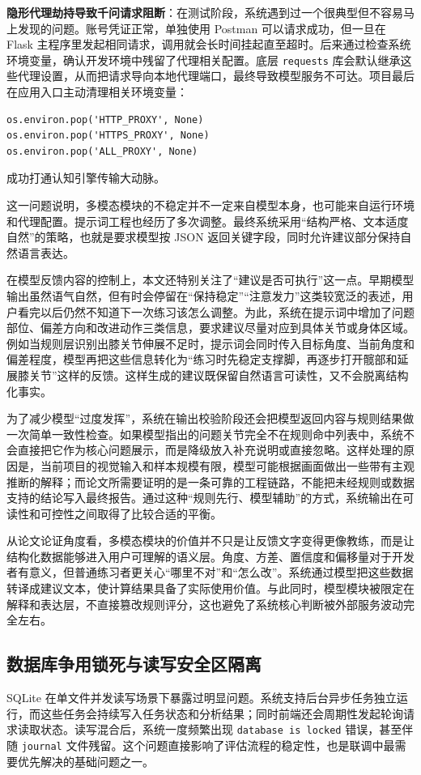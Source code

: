 \textbf{隐形代理劫持导致千问请求阻断}：在测试阶段，系统遇到过一个很典型但不容易马上发现的问题。账号凭证正常，单独使用 Postman 可以请求成功，但一旦在 Flask 主程序里发起相同请求，调用就会长时间挂起直至超时。后来通过检查系统环境变量，确认开发环境中残留了代理相关配置。底层 \texttt{requests} 库会默认继承这些代理设置，从而把请求导向本地代理端口，最终导致模型服务不可达。项目最后在应用入口主动清理相关环境变量：
\begin{verbatim}
os.environ.pop('HTTP_PROXY', None)
os.environ.pop('HTTPS_PROXY', None)
os.environ.pop('ALL_PROXY', None)
\end{verbatim}
成功打通认知引擎传输大动脉。

这一问题说明，多模态模块的不稳定并不一定来自模型本身，也可能来自运行环境和代理配置。提示词工程也经历了多次调整。最终系统采用“结构严格、文本适度自然”的策略，也就是要求模型按 JSON 返回关键字段，同时允许建议部分保持自然语言表达。

在模型反馈内容的控制上，本文还特别关注了“建议是否可执行”这一点。早期模型输出虽然语气自然，但有时会停留在“保持稳定”“注意发力”这类较宽泛的表述，用户看完以后仍然不知道下一次练习该怎么调整。为此，系统在提示词中增加了问题部位、偏差方向和改进动作三类信息，要求建议尽量对应到具体关节或身体区域。例如当规则层识别出膝关节伸展不足时，提示词会同时传入目标角度、当前角度和偏差程度，模型再把这些信息转化为“练习时先稳定支撑脚，再逐步打开髋部和延展膝关节”这样的反馈。这样生成的建议既保留自然语言可读性，又不会脱离结构化事实。

为了减少模型“过度发挥”，系统在输出校验阶段还会把模型返回内容与规则结果做一次简单一致性检查。如果模型指出的问题关节完全不在规则命中列表中，系统不会直接把它作为核心问题展示，而是降级放入补充说明或直接忽略。这样处理的原因是，当前项目的视觉输入和样本规模有限，模型可能根据画面做出一些带有主观推断的解释；而论文所需要证明的是一条可靠的工程链路，不能把未经规则或数据支持的结论写入最终报告。通过这种“规则先行、模型辅助”的方式，系统输出在可读性和可控性之间取得了比较合适的平衡。

从论文论证角度看，多模态模块的价值并不只是让反馈文字变得更像教练，而是让结构化数据能够进入用户可理解的语义层。角度、方差、置信度和偏移量对于开发者有意义，但普通练习者更关心“哪里不对”和“怎么改”。系统通过模型把这些数据转译成建议文本，使计算结果具备了实际使用价值。与此同时，模型模块被限定在解释和表达层，不直接篡改规则评分，这也避免了系统核心判断被外部服务波动完全左右。

\subsection{数据库争用锁死与读写安全区隔离}
SQLite 在单文件并发读写场景下暴露过明显问题。系统支持后台异步任务独立运行，而这些任务会持续写入任务状态和分析结果；同时前端还会周期性发起轮询请求读取状态。读写混合后，系统一度频繁出现 \texttt{database is locked} 错误，甚至伴随 \texttt{journal} 文件残留。这个问题直接影响了评估流程的稳定性，也是联调中最需要优先解决的基础问题之一。

